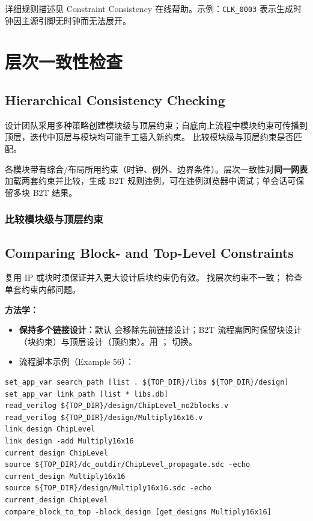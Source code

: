 详细规则描述见 Constraint Consistency 在线帮助。示例：\texttt{CLK\_0003} 表示生成时钟因主源引脚无时钟而无法展开。

\section{层次一致性检查}
\subsection*{Hierarchical Consistency Checking}

设计团队采用多种策略创建模块级与顶层约束；自底向上流程中模块约束可传播到顶层，迭代中顶层与模块均可能手工插入新约束。 比较模块级与顶层约束是否匹配。

各模块带有综合/布局所用约束（时钟、例外、边界条件）。层次一致性对\textbf{同一网表}加载两套约束并比较，生成 B2T 规则违例，可在违例浏览器中调试；单会话可保留多块 B2T 结果。


\subsubsection{比较模块级与顶层约束}
\subsection*{Comparing Block- and Top-Level Constraints}

复用 IP 或块时须保证并入更大设计后块约束仍有效。 找层次约束不一致； 检查单套约束内部问题。

\textbf{方法学：}
\begin{itemize}
  \item \textbf{保持多个链接设计：}默认  会移除先前链接设计；B2T 流程需同时保留块设计（块约束）与顶层设计（顶约束）。用 ； 切换。
  \item 流程脚本示例（Example 56）：
\end{itemize}

\begin{lstlisting}
set_app_var search_path [list . ${TOP_DIR}/libs ${TOP_DIR}/design]
set_app_var link_path [list * libs.db]
read_verilog ${TOP_DIR}/design/ChipLevel_no2blocks.v
read_verilog ${TOP_DIR}/design/Multiply16x16.v
link_design ChipLevel
link_design -add Multiply16x16
current_design ChipLevel
source ${TOP_DIR}/dc_outdir/ChipLevel_propagate.sdc -echo
current_design Multiply16x16
source ${TOP_DIR}/design/Multiply16x16.sdc -echo
current_design ChipLevel
compare_block_to_top -block_design [get_designs Multiply16x16]
\end{lstlisting}

